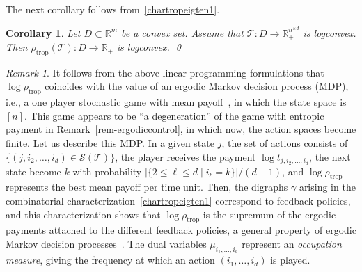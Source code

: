 \documentclass{amsart}
\newcommand{\support}{\mathcal{S}}
\newcommand{\R}{\mathbb{R}}
\newcommand{\0}{\mathbf{0}}
\newcommand{\1}{\mathbf{1}}
\newcommand{\cT}{\mathcal{T}}
\newcommand{\trop}{\mathrm{trop}}
\newtheorem{corollary}[theo]{Corollary}
\theoremstyle{remark}
\newtheorem{rem}{Remark}
\numberwithin{equation}{section} %
\renewcommand{\leq}{\leqslant}
\begin{document}
The next corollary follows from~\eqref{chartropeigten1}.
 \begin{corollary}\label{logconvtrop}  Let $D\subset \R^m$ be a convex set.  Assume that $\cT:D\to \R_+^{n^{\times d}}$ is logconvex.
 Then $\rho_{\trop}(\cT):D\to\R_+$ is logconvex.
\hfill\qed
 \end{corollary}

\begin{rem}
It follows from the above linear programming formulations
that $\log\rho_{\trop}$ coincides
with the value of an ergodic Markov decision process (MDP), i.e.,
a one player stochastic game with mean payoff~\cite{whittle86},
in which the state space is $[n]$. This game appears
to be ``a degeneration'' of the game with entropic 
payment in Remark~\ref{rem-ergodiccontrol}, in which now, the action spaces
become finite.  
%
Let us describe
this MDP. In a given state $j$, the set
of actions consists of $\{(j,i_2,\dots,i_d)\in \bar{\support}(\cT)\}$,
the player receives the payment $\log t_{j,i_2,\dots ,i_d}$, 
the next state become $k$ with probability $|\{2\leq \ell\leq d\mid 
i_\ell =k\}|/(d-1)$, and
$\log \rho_{\trop}$ represents the best mean payoff per time unit.
Then, the digraphs $\gamma$ arising in the combinatorial
characterization~\eqref{chartropeigten1} correspond to feedback policies,
and this characterization shows that $\log \rho_{\trop}$ is the
supremum of the ergodic payments attached to the different
feedback policies, a general property of ergodic Markov decision processes~\cite[Prop.~7.2]{AG03}.
The dual variables $\mu_{i_1,\dots,i_d}$ represent
an {\em occupation measure}, giving the frequency
at which an action $(i_1,\dots,i_d)$ is played.
\end{rem}
\end{document}
